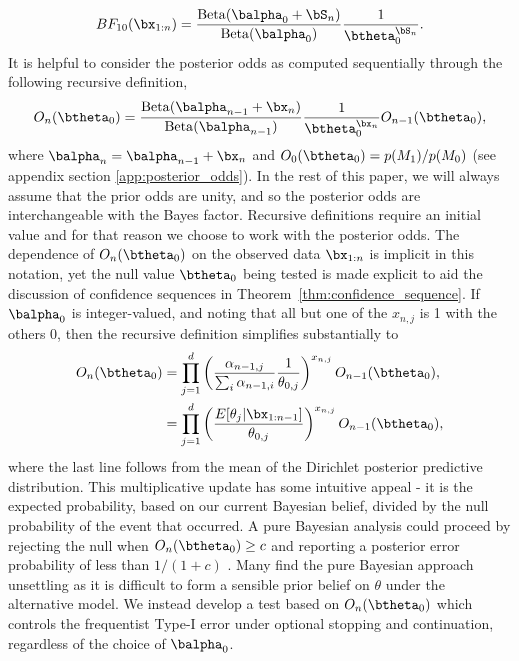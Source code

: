 \documentclass[11pt]{article}
\newcommand{\Beta}{\mathrm{Beta}}
\begin{document}
\begin{equation}
  \label{eq:simplified_bayes_factor}
 BF_{10}(\bx_{1:n}) = \frac{\Beta(\balpha_0 + \bS_n)}{\Beta(\balpha_0)}\frac{1}{\btheta_0^{\bS_n}}.
\end{equation}
It is helpful to consider the posterior odds as computed sequentially through the following recursive definition,
\begin{equation}
  \label{eq:update_rule}
  O_{n}(\btheta_0) = \frac{\Beta(\balpha_{n-1} + \bx_n)}{\Beta(\balpha_{n-1})}\frac{1}{\btheta_0^{\bx_n}} O_{n-1}(\btheta_0),
\end{equation}
where $\balpha_n = \balpha_{n-1}+\bx_n$ and $O_0(\btheta_0)=p(M_1)/p(M_0)$ (see appendix section \ref{app:posterior_odds}).
In the rest of this paper, we will always assume that the prior odds are unity, and so the posterior odds are interchangeable with the Bayes factor.
Recursive definitions require an initial value and for that reason we choose to work with the posterior odds.
The dependence of $O_n(\btheta_0)$ on the observed data $\bx_{1:n}$ is implicit in this notation, yet the null value $\btheta_0$ being tested is made explicit to aid the discussion of confidence sequences in Theorem~\ref{thm:confidence_sequence}.
If $\balpha_0$ is integer-valued, and noting that all but one of the $x_{n,j}$ is 1 with the others 0, then the recursive definition simplifies substantially to
\begin{align}
  \label{eq:simplified_bayes_factor}
  O_{n}(\btheta_0) &= \prod_{j=1}^{d} \left(\frac{\alpha_{n-1,j}}{\sum_i \alpha_{n-1,i}} \frac{1}{\theta_{0,j}}\right)^{x_{n,j}} O_{n-1}(\btheta_0),\\
  &=\prod_{j=1}^{d}\left(\frac{E[\theta_j|\bx_{1:n-1}]}{\theta_{0,j}} \right)^{x_{n,j}} O_{n-1}(\btheta_0),
\end{align}
where the last line follows from the mean of the Dirichlet posterior predictive distribution.
This multiplicative update has some intuitive appeal - it is the expected probability, based on our current Bayesian belief, divided by the null probability of the event that occurred.
A pure Bayesian analysis could proceed by rejecting the null when $O_n(\btheta_0) \geq c$ and reporting a posterior error probability of less than $1/(1+c)$ \citep[Chapter 5]{bernardo}.
Many find the pure Bayesian approach unsettling as it is difficult to form a sensible prior belief on $\theta$ under the alternative model.
We instead develop a test based on $O_n(\btheta_0)$ which controls the frequentist Type-I error under optional stopping and continuation, regardless of the choice of $\balpha_0$.
\end{document}
